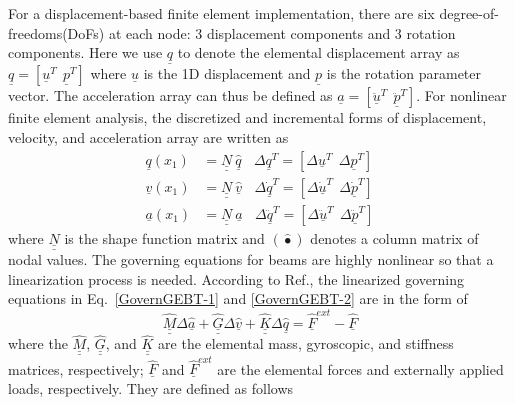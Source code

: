 \documentclass{aiaa-tc}
\newcommand{\tens}[1]{\underline{\underline{#1}}}
\renewcommand{\vec}[1]{\underline{#1}}
\begin{document}
For a displacement-based finite element implementation, there are six degree-of-freedoms(DoFs) at each node: 3 displacement components and 3 rotation components. Here we use $\vec{q}$ to denote the elemental displacement array as $\underline{q}=\left[ \underline{u}^T~~\underline{p}^T\right]$ where $\vec{u}$ is the 1D displacement and $\vec{p}$ is the rotation parameter vector. The acceleration array can thus be defined as $\underline{a}=\left[ \ddot{\underline{u}}^T~~ \ddot{\underline{p}}^T \right]$. For nonlinear finite element analysis, the discretized and incremental forms of displacement, velocity, and acceleration array are written as
\begin{align}
	\label{Discretized}
	\underline{q} (x_1) &= \underline{\underline{N}} ~\hat{\underline{q}}~~~~\Delta \underline{q}^T = \left[ \Delta \underline{u}^T~~\Delta \underline{p}^T \right] \\
	\underline{v}(x_1) &= \underline{\underline{N}}~\hat{\underline{v}}~~~~\Delta \underline{\dot{q}}^T = \left[\Delta \underline{\dot{u}}^T~~\Delta \underline{\dot{p}}^T \right] \\
	\underline{a}(x_1) &= \underline{\underline{N}}~ \hat{\underline{a}}~~~~\Delta \underline{\ddot{q}}^T = \left[ \Delta \ddot{\underline{u}}^T~~\Delta \ddot{\underline{p}}^T \right]	
\end{align}
where $\tens{N}$ is the shape function matrix and $(\hat{\bullet})$ denotes a column matrix of nodal values.
The governing equations for beams are highly nonlinear so that a linearization process is needed. According to Ref.\cite{Bauchau:2010}, the linearized governing equations in Eq.~\eqref{GovernGEBT-1} and \eqref{GovernGEBT-2} are in the form of
\begin{equation}
	\label{LinearizedEqn}
	\hat{\underline{\underline{M}}} \Delta \hat{\underline{a}} +\hat{\underline{\underline{G}}} \Delta \hat{\underline{v}}+ \hat{\underline{\underline{K}}} \Delta \hat{\underline{q}} = \hat{\underline{F}}^{ext} - \hat{\underline{F}}
\end{equation} 
where the $\hat{\tens{M}}$, $\hat{\tens{G}}$, and $\hat{\tens{K}}$ are the elemental mass, gyroscopic, and stiffness matrices, respectively; $\hat{\vec{F}}$ and $\hat{\vec{F}}^{ext}$ are the elemental forces and externally applied loads, respectively. They are defined as follows
\end{document}
